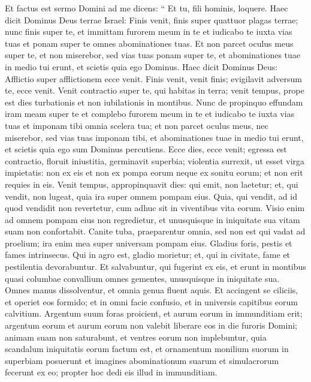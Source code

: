\begin{biblechapter}
\begin{biblechapter}
\begin{biblechapter}
\begin{biblechapter}
\begin{biblechapter}
\begin{biblechapter}
\begin{biblechapter}
\verse Et factus est sermo Domini ad me dicens: 
\verse “ Et tu, fili hominis, loquere. Haec dicit Dominus Deus terrae Israel: Finis venit, finis super quattuor plagas terrae; 
\verse nunc finis super te, et immittam furorem meum in te et iudicabo te iuxta vias tuas et ponam super te omnes abominationes tuas. 
 \verse Et non parcet oculus meus super te, et non miserebor, sed vias tuas ponam super te, et abominationes tuae in medio tui erunt, et scietis quia ego Dominus.
 \verse Haec dicit Dominus Deus: Afflictio super afflictionem ecce venit. 
\verse Finis venit, venit finis; evigilavit adversum te, ecce venit. 
\verse Venit contractio super te, qui habitas in terra; venit tempus, prope est dies turbationis et non iubilationis in montibus. 
\verse Nunc de propinquo effundam iram meam super te et complebo furorem meum in te et iudicabo te iuxta vias tuas et imponam tibi omnia scelera tua; 
\verse et non parcet oculus meus, nec miserebor, sed vias tuas imponam tibi, et abominationes tuae in medio tui erunt, et scietis quia ego sum Dominus percutiens.
 \verse Ecce dies, ecce venit; egressa est contractio, floruit iniustitia, germinavit superbia; 
\verse violentia surrexit, ut esset virga impietatis: non ex eis et non ex pompa eorum neque ex sonitu eorum; et non erit requies in eis. 
\verse Venit tempus, appropinquavit dies: qui emit, non laetetur; et, qui vendit, non lugeat, quia ira super omnem pompam eius. 
\verse Quia, qui vendit, ad id quod vendidit non revertetur, cum adhuc sit in viventibus vita eorum. Visio enim ad omnem pompam eius non regredietur, et unusquisque in iniquitate sua vitam suam non confortabit. 
\verse Canite tuba, praeparentur omnia, sed non est qui vadat ad proelium; ira enim mea super universam pompam eius.
 \verse Gladius foris, pestis et fames intrinsecus. Qui in agro est, gladio morietur; et, qui in civitate, fame et pestilentia devorabuntur. 
\verse Et salvabuntur, qui fugerint ex eis, et erunt in montibus quasi columbae convallium omnes gementes, unusquisque in iniquitate sua.
 \verse Omnes manus dissolventur, et omnia genua fluent aquis. 
\verse Et accingent se ciliciis, et operiet eos formido; et in omni facie confusio, et in universis capitibus eorum calvitium. 
\verse Argentum suum foras proicient, et aurum eorum in immunditiam erit; argentum eorum et aurum eorum non valebit liberare eos in die furoris Domini; animam suam non saturabunt, et ventres eorum non implebuntur, quia scandalum iniquitatis eorum factum est, 
\verse et ornamentum monilium suorum in superbiam posuerunt et imagines abominationum suarum et simulacrorum fecerunt ex eo; propter hoc dedi eis illud in immunditiam. 

\end{biblechapter}
\end{biblechapter}
\end{biblechapter}
\end{biblechapter}
\end{biblechapter}
\end{biblechapter}
\end{biblechapter}
